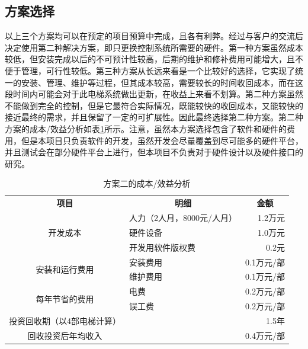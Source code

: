 \subsection{方案选择}
以上三个方案均可以在预定的项目预算中完成，且各有利弊。经过与客户的交流后决定使用第二种解决方案，即只更换控制系统所需要的硬件。第一种方案虽然成本较低，但安装完成以后的不可预计性较高，后期的维护和修补费用可能增大，且不便于管理，可行性较低。第三种方案从长远来看是一个比较好的选择，它实现了统一的安装、管理、维护等过程，但其成本较高，需要较长的时间收回成本，而在这段时间内可能会对于此电梯系统做出更新，在收益上来看不划算。第二种方案虽然不能做到完全的控制，但是它最符合实际情况，既能较快的收回成本，又能较快的接近最终的需求，并且保留了一定的可扩展性。因此最终选择第二种方案。第二种方案的成本/效益分析如表\ref{tab:planB}所示。注意，虽然本方案选择包含了软件和硬件的费用，但是本项目只负责软件的开发，虽然开发会尽量覆盖到尽可能多的硬件平台，并且测试会在部分硬件平台上进行，但本项目不负责对于硬件设计以及硬件接口的研究。
\begin{table}[H]
	\centering
	\caption{方案二的成本/效益分析}
	\label{tab:planB}
	\begin{tabular}{c l r}
		\toprule
		\multicolumn{1}{c}{\textbf{项目}} &
		\multicolumn{1}{c}{\textbf{明细}} &
		\multicolumn{1}{c}{\textbf{金额}} \\ \cmidrule(lr){1-1} \cmidrule(lr){2-2} \cmidrule(lr){3-3}

		\multirow{3}{*}{开发成本}
		& 人力（2人月，8000元/人月） & 1.2万元 \\	\cmidrule(lr){2-3}
		& 硬件设备 & 1.0万元 \\	\cmidrule(lr){2-3}
		& 开发用软件版权费 & 0.2元 \\ \cmidrule(lr){1-3}

		\multirow{2}{*}{安装和运行费用}
		& 安装费用 & 0.1万元/部 \\ \cmidrule(lr){2-3}
		& 维护费用 & 0.1万元/部 \\	\cmidrule(lr){1-3}

		\multirow{2}{*}{每年节省的费用}
		& 电费 & 0.2万元/部 \\ \cmidrule(lr){2-3}
		& 误工费 & 0.2万元/部 \\ \cmidrule(lr){1-3}

		投资回收期（以4部电梯计算） & & 1.5年\\
		回收投资后年均收入 & & 0.4万元/部 \\
		\bottomrule
	\end{tabular}
\end{table}

